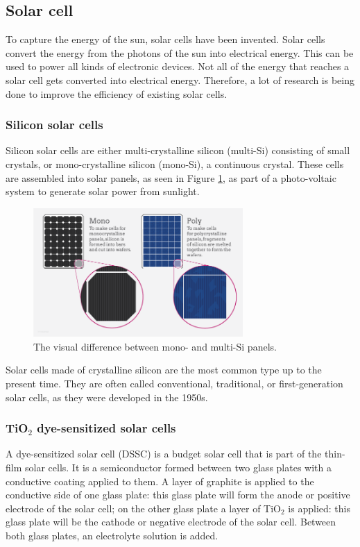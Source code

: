 \documentclass[conference]{IEEEtran}
\begin{document}
\subsection{Solar cell}
To capture the energy of the sun, solar cells have been invented. Solar cells convert the energy from the photons of the sun into electrical energy. This can be used to power all kinds of electronic devices. Not all of the energy that reaches a solar cell gets converted into electrical energy. Therefore, a lot of research is being done to improve the efficiency of existing solar cells.\\

\subsubsection{Silicon solar cells}
Silicon solar cells are either multi-crystalline silicon (multi-Si) consisting of small crystals, or mono-crystalline silicon (mono-Si), a continuous crystal. These cells are assembled into solar panels, as seen in Figure \ref{fig:monomulti}, as part of a photo-voltaic system to generate solar power from sunlight.\\

\begin{figure}[h]
\centering
\includegraphics[width=80mm]{img/monomulti.png}
\caption{The visual difference between mono- and multi-Si panels. \cite{monomulti}}
\label{fig:monomulti} %
\end{figure}

Solar cells made of crystalline silicon are the most common type up to the present time. They are often called conventional, traditional, or first-generation solar cells, as they were developed in the 1950s.\\

\subsubsection{TiO$_2$ dye-sensitized solar cells}
A dye-sensitized solar cell (DSSC) is a budget solar cell that is part of the thin-film solar cells. It is a semiconductor formed between two glass plates with a conductive coating applied to them. A layer of graphite is applied to the conductive side of one glass plate: this glass plate will form the anode or positive electrode of the solar cell; on the other glass plate a layer of TiO$_2$ is applied: this glass plate will be the cathode or negative electrode of the solar cell. Between both glass plates, an electrolyte solution is added.\\
\end{document}
